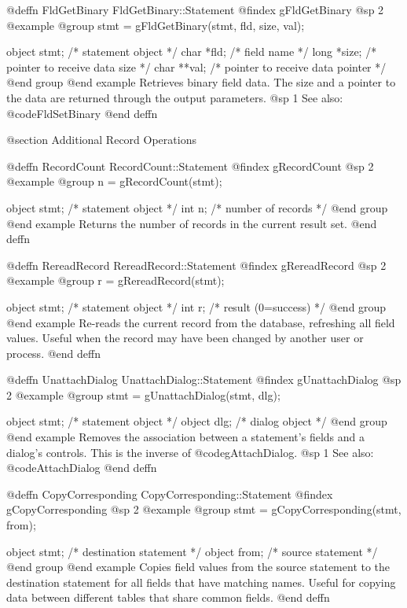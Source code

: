 @deffn {FldGetBinary} FldGetBinary::Statement
@findex gFldGetBinary
@sp 2
@example
@group
stmt = gFldGetBinary(stmt, fld, size, val);

object  stmt;   /*  statement object                 */
char    *fld;   /*  field name                       */
long    *size;  /*  pointer to receive data size     */
char    **val;  /*  pointer to receive data pointer  */
@end group
@end example
Retrieves binary field data.  The size and a pointer to the data are
returned through the output parameters.
@sp 1
See also:  @code{FldSetBinary}
@end deffn



@section Additional Record Operations


@deffn {RecordCount} RecordCount::Statement
@findex gRecordCount
@sp 2
@example
@group
n = gRecordCount(stmt);

object  stmt;   /*  statement object       */
int     n;      /*  number of records      */
@end group
@end example
Returns the number of records in the current result set.
@end deffn



@deffn {RereadRecord} RereadRecord::Statement
@findex gRereadRecord
@sp 2
@example
@group
r = gRereadRecord(stmt);

object  stmt;   /*  statement object       */
int     r;      /*  result (0=success)     */
@end group
@end example
Re-reads the current record from the database, refreshing all field
values.  Useful when the record may have been changed by another user
or process.
@end deffn



@deffn {UnattachDialog} UnattachDialog::Statement
@findex gUnattachDialog
@sp 2
@example
@group
stmt = gUnattachDialog(stmt, dlg);

object  stmt;   /*  statement object   */
object  dlg;    /*  dialog object      */
@end group
@end example
Removes the association between a statement's fields and a dialog's
controls.  This is the inverse of @code{gAttachDialog}.
@sp 1
See also:  @code{AttachDialog}
@end deffn



@deffn {CopyCorresponding} CopyCorresponding::Statement
@findex gCopyCorresponding
@sp 2
@example
@group
stmt = gCopyCorresponding(stmt, from);

object  stmt;   /*  destination statement   */
object  from;   /*  source statement        */
@end group
@end example
Copies field values from the source statement to the destination
statement for all fields that have matching names.  Useful for copying
data between different tables that share common fields.
@end deffn



